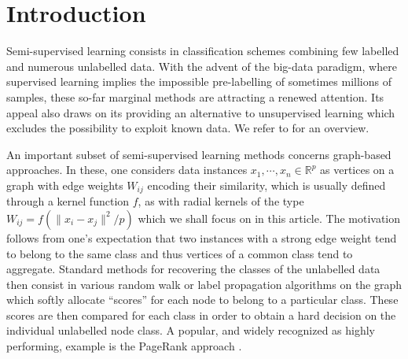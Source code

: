 \documentclass[twoside,11pt]{article}
\begin{document}
\section{Introduction}
\label{sec:intro}
Semi-supervised learning consists in classification schemes combining few labelled and numerous unlabelled data. With the advent of the big-data paradigm, where supervised learning implies the impossible pre-labelling of sometimes millions of samples, these so-far marginal methods are attracting a renewed attention. Its appeal also draws on its providing an alternative to unsupervised learning which excludes the possibility to exploit known data. We refer to \citet{chapelle2006ssl} for an overview.

An important subset of semi-supervised learning methods concerns graph-based approaches. In these, one considers data instances $x_{1},\cdots,x_{n}\in\mathbb{R}^{p}$ as vertices on a graph with edge weights $W_{ij}$ encoding their similarity, which is usually defined through a kernel function $f$, as with radial kernels of the type $W_{ij}=f(\|x_{i}-x_{j}\|^{2}/p)$ which we shall focus on in this article. The motivation follows from one's expectation that two instances with a strong edge weight tend to belong to the same class and thus vertices of a common class tend to aggregate. Standard methods for recovering the classes of the unlabelled data then consist in various random walk \citep{jaakkola2002partially} or label propagation \citep{zhu2002learning} algorithms on the graph which softly allocate ``scores'' for each node to belong to a particular class. These scores are then compared for each class in order to obtain a hard decision on the individual unlabelled node class. A popular, and widely recognized as highly performing, example is the PageRank approach \citep{avrachenkov2011generalized}.
\end{document}
